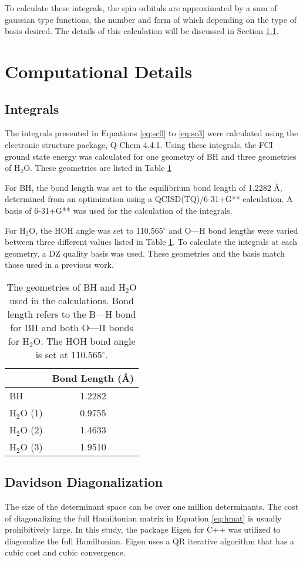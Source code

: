 \documentclass[final,3p,times,twocolumn]{elsarticle}
\begin{document}
To calculate these integrals, the spin orbitals are approximated by a sum of gaussian type functions,\cite{gto} the number and form of which depending on the type of basis desired. The details of this calculation will be discussed in Section \ref{sec:integrals}.

\section{Computational Details}
\subsection{Integrals} \label{sec:integrals}
The integrals presented in Equations \eqref{eq:sc0} to \eqref{eq:sc3} were calculated using the electronic structure package, Q-Chem 4.4.1.\cite{qchem} Using these integrals, the FCI ground state energy was calculated for one geometry of BH and three geometries of H$_2$O. These geometries are listed in Table \ref{tab:geo}

For BH, the bond length was set to the equilibrium bond length of 1.2282 \AA, determined from an optimization using a QCISD(TQ)/6-31+G** calculation.\cite{cccbdb} A basis of 6-31+G** was used for the calculation of the integrals. 

For H$_2$O, the HOH angle was set to 110.565$^\circ$ and O---H bond lengths were varied between three different values listed in Table \ref{tab:geo}. To calculate the integrals at each geometry, a DZ quality basis was used. These geometries and the basis match those used in a previous work.\cite{handy-1983}

\begin{table}
\centering
\begin{tabular}{l|c}
\hline\hline
& Bond Length (\AA) \\ \hline
BH & 1.2282 \\ \hline
H$_2$O (1) & 0.9755\\
H$_2$O (2) & 1.4633\\
H$_2$O (3) & 1.9510\\ \hline\hline
\end{tabular}
\caption{The geometries of BH and H$_2$O used in the calculations. Bond length refers to the B---H bond for BH and both O---H bonds for H$_2$O. The HOH bond angle is set at 110.565$^\circ$.}
\label{tab:geo}
\end{table}

\subsection{Davidson Diagonalization}
The size of the determinant space can be over one million determinants. The cost of diagonalizing the full Hamiltonian matrix in Equation \eqref{eq:hmat} is usually prohibitively large. In this study, the package Eigen for C++ was utilized to diagonalize the full Hamiltonian.\cite{eigen} Eigen uses a QR iterative algorithm that has a cubic cost and cubic convergence.\cite{qr}
\end{document}
